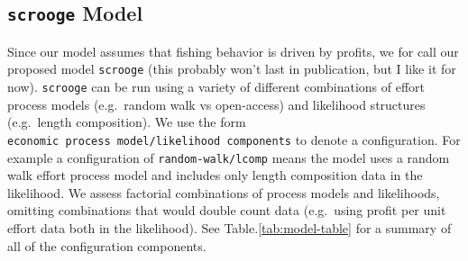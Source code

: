 \documentclass[twoside,12pt,final]{ucthesis-CA2012}
\begin{document}
\begin{ucmainmatter}
\subsection{\texorpdfstring{\texttt{scrooge}
Model}{scrooge Model}}\label{scrooge-model}

Since our model assumes that fishing behavior is driven by profits, we
for call our proposed model \texttt{scrooge} (this probably won't last
in publication, but I like it for now). \texttt{scrooge} can be run
using a variety of different combinations of effort process models
(e.g.~random walk vs open-access) and likelihood structures (e.g.~length
composition). We use the form
\texttt{economic\ process\ model/likelihood\ components} to denote a
configuration. For example a configuration of \texttt{random-walk/lcomp}
means the model uses a random walk effort process model and includes
only length composition data in the likelihood. We assess factorial
combinations of process models and likelihoods, omitting combinations
that would double count data (e.g.~using profit per unit effort data
both in the likelihood). See Table.\ref{tab:model-table} for a summary
of all of the configuration components.
\begin{table}


\end{table}
\end{ucmainmatter}
\end{document}
